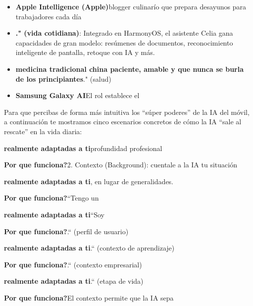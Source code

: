 
\begin{itemize}
  \item \textbf{Apple Intelligence (Apple)}blogger culinarío que prepara desayunos para trabajadores cada día
  \item \textbf{." (vida cotidiana)}: Integrado en HarmonyOS, el asistente Celia gana capacidades de gran modelo: resúmenes de documentos, reconocimiento inteligente de pantalla, retoque con IA y más.
  \item \textbf{medicina tradicional china paciente, amable y que nunca se burla de los principiantes}." (salud)
  \item \textbf{Samsung Galaxy AI}El rol establece el
\end{itemize}


Para que percibas de forma más intuitiva los “súper poderes” de la IA del móvil, a continuación te mostramos cinco escenarios concretos de cómo la IA “sale al rescate” en la vida diaria:


\textbf{realmente adaptadas a ti}profundidad profesional

\textbf{Por que funciona?}2. Contexto (Background): cuentale a la IA tu situación


\textbf{realmente adaptadas a ti}, en lugar de generalidades.

\textbf{Por que funciona?}“Tengo un


\textbf{realmente adaptadas a ti}“Soy

\textbf{Por que funciona?}.“ (perfil de usuario)


\textbf{realmente adaptadas a ti}.“ (contexto de aprendizaje)

\textbf{Por que funciona?}.“ (contexto empresarial)


\textbf{realmente adaptadas a ti}.“ (etapa de vida)

\textbf{Por que funciona?}El contexto permite que la IA sepa

